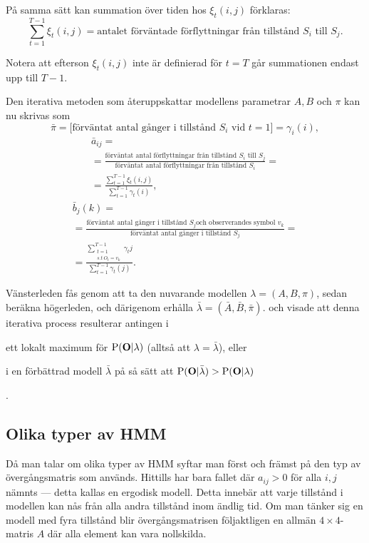 \documentclass[../rapport_MVEX01-11-05]{subfiles}
\begin{document}
På samma sätt kan summation över tiden hos  $\xi_t(i,j)$ förklaras:
\begin{equation*}
\sum_{t=1}^{T-1}\xi_t(i,j) = \text{antalet förväntade förflyttningar
  från tillstånd $S_i$ till $S_j$}.
\end{equation*}

Notera att efterson $\xi_t(i,j)$ inte är definierad för $t=T$ går summationen 
endast upp till $T -1$. 

Den iterativa metoden som återuppskattar modellens parametrar $A,B$
och $\pi$ kan nu skrivas som
\begin{equation*}
\bar{\pi} = \text{[förväntat antal gånger i tillstånd $S_i$ vid
  $t=1$]} = \gamma_i(i),
\end{equation*}
\begin{multline*}
\bar{a}_{ij} = \\ = \frac{\text{förväntat antal förflyttningar från
    tillstånd $S_i$ till $S_j$}}{\text{förväntat antal förflyttningar
    från tillstånd $S_i$}} = \\ =
\frac{\sum_{t=1}^{T-1}\xi_t(i,j)}{\sum_{t=1}^{T-1}\gamma_t(i)},
\end{multline*}
\begin{multline*}
\bar{b}_j(k) = \\ = \frac{\text{förväntat antal gånger i tillstånd $S_j$
    och observerandes symbol $v_k$}}{\text{förväntat antal gånger i
    tillstånd $S_j$}} = \\ = \frac{\sum_{\substack{t=1\\s.t~ O_t =
      v_k}}^{T-1}\gamma_t{j}}{\sum_{t=1}^{T-1}\gamma_t(j)}.
\end{multline*}

Vänsterleden fås genom att ta den nuvarande modellen $\lambda =
(A,B,\pi)$, sedan beräkna högerleden, och därigenom erhålla $\bar{\lambda} =
(\bar{A},\bar{B}, \bar{\pi})$.  och 
visade att denna iterativa process resulterar antingen i
\begin{inparaenum}
	\item ett lokalt maximum för $\mathrm{P}(\mathbf{O}|\lambda)$
  (alltså att $\lambda = \bar{\lambda}$), eller
 	\item i en förbättrad modell $\bar{\lambda}$ på så sätt att
  $\mathrm{P}(\mathbf{O}|\bar{\lambda}) > \mathrm{P}(\mathbf{O}|\lambda)$
\end{inparaenum}. 

\subsection{Olika typer av HMM}
Då man talar om olika typer av HMM syftar man först och främst på
den typ av övergångsmatris som används. Hittills har bara 
fallet där $a_{ij} > 0$ för alla $i,j$ nämnts --- detta kallas en ergodisk
modell. Detta innebär att varje tillstånd i modellen
kan nås från alla andra tillstånd inom ändlig tid. Om man
tänker sig en modell med fyra tillstånd blir övergångsmatrisen
följaktligen en allmän $4\times 4$-matris $A$ där alla element kan vara nollskilda.
\end{document}
